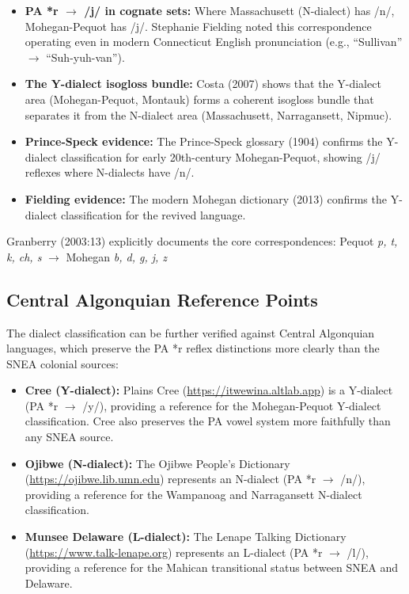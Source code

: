 \begin{itemize}
  \item \textbf{PA *r $\rightarrow$ /j/ in cognate sets:} Where Massachusett
    (N-dialect) has /n/, Mohegan-Pequot has /j/. Stephanie Fielding noted
    this correspondence operating even in modern Connecticut English
    pronunciation (e.g., ``Sullivan'' $\rightarrow$ ``Suh-yuh-van'').

  \item \textbf{The Y-dialect isogloss bundle:} Costa (2007) shows that the
    Y-dialect area (Mohegan-Pequot, Montauk) forms a coherent isogloss
    bundle that separates it from the N-dialect area (Massachusett,
    Narragansett, Nipmuc).

  \item \textbf{Prince-Speck evidence:} The Prince-Speck glossary (1904)
    confirms the Y-dialect classification for early 20th-century
    Mohegan-Pequot, showing /j/ reflexes where N-dialects have /n/.

  \item \textbf{Fielding evidence:} The modern Mohegan dictionary (2013)
    confirms the Y-dialect classification for the revived language.
\end{itemize}

Granberry (2003:13) explicitly documents the core correspondences: Pequot
\textit{p, t, k, ch, s} $\rightarrow$ Mohegan \textit{b, d, g, j, z}

\subsection{Central Algonquian Reference Points}

The dialect classification can be further verified against Central Algonquian
languages, which preserve the PA *r reflex distinctions more clearly than
the SNEA colonial sources:

\begin{itemize}
  \item \textbf{Cree (Y-dialect):} Plains Cree (\url{https://itwewina.altlab.app})
    is a Y-dialect (PA *r $\rightarrow$ /y/), providing a reference for the
    Mohegan-Pequot Y-dialect classification. Cree also preserves the PA
    vowel system more faithfully than any SNEA source.
  \item \textbf{Ojibwe (N-dialect):} The Ojibwe People's Dictionary
    (\url{https://ojibwe.lib.umn.edu}) represents an N-dialect (PA *r
    $\rightarrow$ /n/), providing a reference for the Wampanoag and
    Narragansett N-dialect classification.
  \item \textbf{Munsee Delaware (L-dialect):} The Lenape Talking Dictionary
    (\url{https://www.talk-lenape.org}) represents an L-dialect (PA *r
    $\rightarrow$ /l/), providing a reference for the Mahican transitional
    status between SNEA and Delaware.
\end{itemize}

